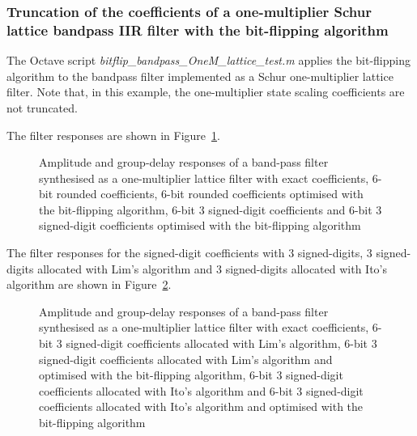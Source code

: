 \documentclass[a4paper,twoside,10pt,english]{report}
\begin{document}
\subsubsection{Truncation of the coefficients of a one-multiplier Schur lattice bandpass IIR filter with the bit-flipping algorithm}
The Octave script \emph{bitflip\_bandpass\_OneM\_lattice\_test.m} applies the
bit-flipping algorithm to the bandpass filter implemented as a Schur 
one-multiplier lattice filter. Note that, in this example, the one-multiplier 
state scaling coefficients are not truncated. 

The filter responses are shown in 
Figure~\ref{fig:bitflip-bandpass-OneM-lattice-response}.
\begin{figure}[!htbp]
\begin{center}
\scalebox{0.7}{}
\caption{Amplitude and group-delay responses of a band-pass filter synthesised
as a one-multiplier lattice filter with exact coefficients,
6-bit rounded coefficients, 6-bit rounded coefficients optimised 
with the bit-flipping algorithm, 6-bit 3 signed-digit coefficients and 6-bit 
3 signed-digit coefficients optimised with the bit-flipping algorithm}
\label{fig:bitflip-bandpass-OneM-lattice-response}
\end{center}
\end{figure}

The filter responses for the signed-digit coefficients with $3$ signed-digits,
$3$ signed-digits allocated with Lim's algorithm and $3$ signed-digits allocated with
Ito's algorithm are shown in 
Figure~\ref{fig:bitflip-bandpass-OneM-lattice-response-allocsd}.
\begin{figure}[!htbp]
\begin{center}
\scalebox{0.7}{}
\caption{Amplitude and group-delay responses of a band-pass filter synthesised
as a one-multiplier lattice filter with exact coefficients,
6-bit 3 signed-digit coefficients allocated with Lim's algorithm, 6-bit 
3 signed-digit coefficients allocated with Lim's algorithm and optimised with
the bit-flipping algorithm, 6-bit 3 signed-digit coefficients allocated with 
Ito's algorithm and 6-bit 3 signed-digit coefficients allocated with Ito's 
algorithm and optimised with the bit-flipping algorithm}
\label{fig:bitflip-bandpass-OneM-lattice-response-allocsd}
\end{center}
\end{figure}
\end{document}
